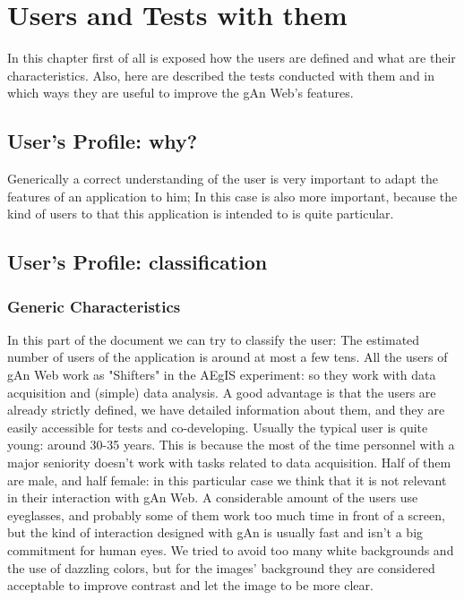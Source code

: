 
\chapter{Users and Tests with them} %

\label{Chapter6} %

In this chapter first of all is exposed how the users are defined and what are their characteristics. Also, here are described the tests conducted with them and in which ways they are useful to improve the gAn Web's features.   

\section{User's Profile: why?}

Generically a correct understanding of the user is very important to adapt the features of an application to him; In this case is also more important, because the kind of users to that this application is intended to is quite particular.


\section{User's Profile: classification}

\subsection{Generic Characteristics}
In this part of the document we can try to classify the user:
The estimated number of users of the application is around at most a few tens.
All the users of gAn Web work as "Shifters" in the AEgIS experiment: so they work with data acquisition and (simple) data analysis.
A good advantage is that the users are already strictly defined, we have detailed information about them, and they are easily accessible for tests and co-developing.
Usually the typical user is quite young: around 30-35 years. This is because the most of the time personnel with a major seniority doesn't work with tasks related to data acquisition. 
Half of them are male, and half female: in this particular case we think that it is not relevant in their interaction with gAn Web.
A considerable amount of the users use eyeglasses, and probably some of them work too much time in front of a screen, but the kind of interaction designed with gAn is usually fast and isn't a big commitment for human eyes. We tried to avoid too many white backgrounds and the use of dazzling colors, but for the images' background they are considered acceptable to improve contrast and let the image to be more clear.  

